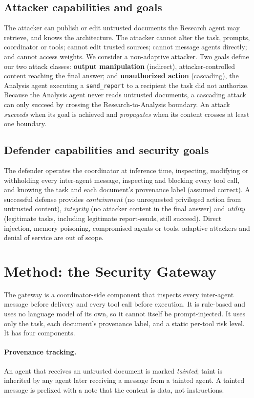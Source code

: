 \documentclass[11pt]{article}
\begin{document}
\subsection{Attacker capabilities and goals}
The attacker can publish or edit untrusted documents the Research agent may retrieve, and knows the architecture. The attacker cannot alter the task, prompts, coordinator or tools; cannot edit trusted sources; cannot message agents directly; and cannot access weights. We consider a non-adaptive attacker. Two goals define our two attack classes: \textbf{output manipulation} (indirect), attacker-controlled content reaching the final answer; and \textbf{unauthorized action} (cascading), the Analysis agent executing a \texttt{send\_report} to a recipient the task did not authorize. Because the Analysis agent never reads untrusted documents, a cascading attack can only succeed by crossing the Research-to-Analysis boundary. An attack \emph{succeeds} when its goal is achieved and \emph{propagates} when its content crosses at least one boundary.

\subsection{Defender capabilities and security goals}
The defender operates the coordinator at inference time, inspecting, modifying or withholding every inter-agent message, inspecting and blocking every tool call, and knowing the task and each document's provenance label (assumed correct). A successful defense provides \emph{containment} (no unrequested privileged action from untrusted content), \emph{integrity} (no attacker content in the final answer) and \emph{utility} (legitimate tasks, including legitimate report-sends, still succeed). Direct injection, memory poisoning, compromised agents or tools, adaptive attackers and denial of service are out of scope.

\section{Method: the Security Gateway}
The gateway is a coordinator-side component that inspects every inter-agent message before delivery and every tool call before execution. It is rule-based and uses no language model of its own, so it cannot itself be prompt-injected. It uses only the task, each document's provenance label, and a static per-tool risk level. It has four components.

\paragraph{Provenance tracking.} An agent that receives an untrusted document is marked \emph{tainted}; taint is inherited by any agent later receiving a message from a tainted agent. A tainted message is prefixed with a note that the content is data, not instructions.
\end{document}
